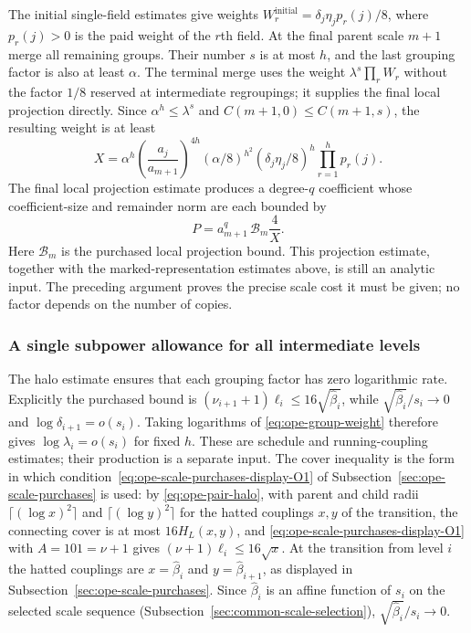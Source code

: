 The initial single-field estimates give weights
$W_r^{\mathrm{initial}}=\delta_j\eta_j p_r(j)/8$, where $p_r(j)>0$
is the paid weight of the $r$th field. At the final parent scale $m+1$
merge all remaining groups. Their number $s$ is at most $h$, and the
last grouping factor is also at least $\alpha$. The terminal merge
uses the weight $\lambda^s\prod_r W_r$ without the factor $1/8$
reserved at intermediate regroupings; it supplies the final local
projection directly. Since $\alpha^h\leq\lambda^s$ and
$C(m+1,0)\leq C(m+1,s)$, the resulting weight is at least
\begin{equation}\label{eq:ope-initial-weight}
 X=\alpha^h
 \left(\frac{a_j}{a_{m+1}}\right)^{4h}
 (\alpha/8)^{h^2}
 (\delta_j\eta_j/8)^h\prod_{r=1}^h p_r(j).
\end{equation}
The final local projection estimate produces a degree-$q$ coefficient
whose coefficient-size and remainder norm are each bounded by
\begin{equation}\label{eq:ope-terminal-coefficient}
 P=a_{m+1}^q\,\mathcal B_m\frac4X.
\end{equation}
Here $\mathcal B_m$ is the purchased local projection bound. This
projection estimate, together with the marked-representation estimates
above, is still an analytic input. The preceding argument proves the
precise scale cost it must be given; no factor depends on the number
of copies.

\subsubsection{A single subpower allowance for all intermediate levels}
The halo estimate ensures that each grouping factor has zero
logarithmic rate. Explicitly the purchased bound is
$(\nu_{i+1}+1)\ell_i\leq16\sqrt{\widehat\beta_i}$,
while $\sqrt{\widehat\beta_i}/s_i\to0$ and
$\log\delta_{i+1}=o(s_i)$. Taking logarithms of
\eqref{eq:ope-group-weight} therefore gives
$\log\lambda_i=o(s_i)$ for fixed $h$. These are schedule and
running-coupling estimates; their production is a separate input.
The cover inequality is the form in which condition~\eqref{eq:ope-scale-purchases-display-O1} of
Subsection~\ref{sec:ope-scale-purchases} is used: by
\eqref{eq:ope-pair-halo}, with parent and child radii
$\lceil(\log x)^2\rceil$ and $\lceil(\log y)^2\rceil$ for the
hatted couplings $x,y$ of the transition, the connecting cover is at
most $16H_L(x,y)$, and \eqref{eq:ope-scale-purchases-display-O1} with $A=101=\nu+1$ gives
$(\nu+1)\ell_i\le16\sqrt{x}$. At the transition from level $i$ the
hatted couplings are $x=\widehat\beta_i$ and $y=\widehat\beta_{i+1}$,
as displayed in Subsection~\ref{sec:ope-scale-purchases}.
Since $\widehat\beta_i$ is an affine function of $s_i$ on the selected
scale sequence (Subsection~\ref{sec:common-scale-selection}),
$\sqrt{\widehat\beta_i}/s_i\to0$.

